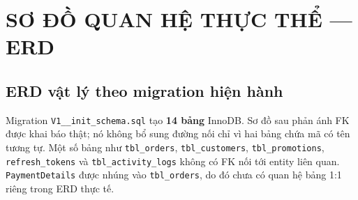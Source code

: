 \documentclass[12pt,a4paper,oneside]{report}
\begin{document}
\chapter{SƠ ĐỒ QUAN HỆ THỰC THỂ — ERD}

\section{ERD vật lý theo migration hiện hành}
Migration \texttt{V1\_\_init\_schema.sql} tạo \textbf{14 bảng} InnoDB. Sơ đồ sau phản ánh FK được khai báo thật; nó không bổ sung đường nối chỉ vì hai bảng chứa mã có tên tương tự. Một số bảng như \texttt{tbl\_orders}, \texttt{tbl\_customers}, \texttt{tbl\_promotions}, \texttt{refresh\_tokens} và \texttt{tbl\_activity\_logs} không có FK nối tới entity liên quan. \texttt{PaymentDetails} được nhúng vào \texttt{tbl\_orders}, do đó chưa có quan hệ bảng 1:1 riêng trong ERD thực tế.
\end{document}
